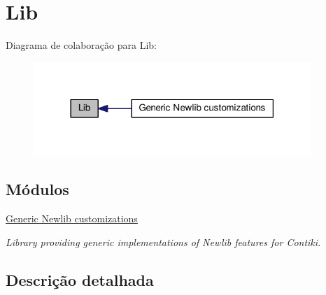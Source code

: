 \hypertarget{group__lib}{\section{Lib}
\label{group__lib}
}
Diagrama de colaboração para Lib\+:\nopagebreak
\begin{figure}[H]
\begin{center}
\leavevmode
\includegraphics[width=297pt]{group__lib}
\end{center}
\end{figure}
\subsection*{Módulos}
\begin{DoxyCompactItemize}
\item 
\hyperlink{group__newlib}{Generic Newlib customizations}
\begin{DoxyCompactList}\small\item\em Library providing generic implementations of Newlib features for Contiki. \end{DoxyCompactList}\end{DoxyCompactItemize}


\subsection{Descrição detalhada}

